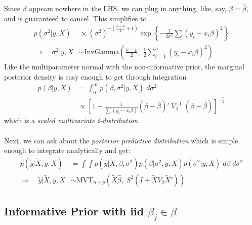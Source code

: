 \documentclass[a4paper,12pt]{scrartcl}
\begin{document}
Since $\beta$ appears nowhere in the LHS, we can plug
in anything, like, say, $\beta = \hat{\beta}$, and is guaranteed to
cancel. This simplifies to
\begin{align*}
    p(\sigma^2 | y, X) &\propto (\sigma^2)^{-\left(\frac{n-p}{2}+ 1
      \right)} \exp\left\{ -\frac{1}{2\sigma^2} \sum (y_i - x_i \beta)^2
      \right\} \\
    \Rightarrow \quad \sigma^2 | y,X &\sim \text{InvGamma}\left(
      \frac{n-p}{2}, \; \frac{1}{2} \sum^n_{i=1} (y_i - x_i\beta)^2 
      \right) 
\end{align*}
Like the multiparameter normal with the non-informative prior, the
marginal posterior density is easy enough to get through integration
\begin{align*}
   p(\beta | y, X) &= \int^\infty_0 p(\beta, \sigma^2 |y, X)\; 
      d\sigma^2 \\
   &\propto \left[ 1+ \frac{1}{\sum (y_i - x_i\beta)} 
      (\beta - \hat{\beta})' \; V_\beta^{-1} \;(\beta - \hat{\beta})
      \right]^{-\frac{n}{2}}
\end{align*}
which is a \emph{scaled multivariate t-distribution}.
\\
\\
Next, we can ask about the \emph{posterior predictive distribution}
which is simple enough to integrate analytically and get:
\begin{align*}
   p(\tilde{y} | \tilde{X}, y, X) &= \int \int p(\tilde{y} | \tilde{X},
      \beta, \sigma^2 ) p(\beta | \sigma^2, y, X) p(\sigma^2|y, X)
      \; d\beta \; d\sigma^2 \\
      \Rightarrow \quad \tilde{y} | \tilde{X}, y, X &\sim 
      \text{MVT}_{n-p}(\tilde{X} \hat{\beta}, \;
      S^2( I + \tilde{X} V_\beta \tilde{X}'))
\end{align*}

\newpage
\subsection{Informative Prior with iid $\beta_j \in \beta$}
\end{document}
